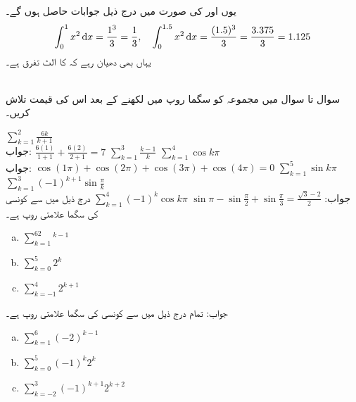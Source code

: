 یوں  اور  کی صورت میں درج ذیل جوابات حاصل ہوں گے۔
\begin{align*}
\int_0^1x^2\dif x=\frac{1^3}{3}=\frac{1}{3},\quad \int_0^{1.5}x^2\dif x=\frac{(1.5)^3}{3}=\frac{3.375}{3}=1.125
\end{align*}
یہاں بھی دھیان رہے کہ  کا الٹ تفرق  ہے۔

\\
سوال  تا سوال  میں مجموعہ کو سگما روپ میں لکھنے کے بعد اس کی قیمت تلاش کریں۔

$\sum\limits_{k=1}^2\tfrac{6k}{k+1}$\\
جواب:\quad
$\tfrac{6(1)}{1+1}+\tfrac{6(2)}{2+1}=7$
$\sum\limits_{k=1}^3\tfrac{k-1}{k}$
$\sum\limits_{k=1}^4\cos k\pi$\\
جواب:\quad
$\cos (1\pi)+\cos(2\pi)+\cos(3\pi)+\cos(4\pi)=0$
$\sum\limits_{k=1}^5\sin k\pi$
$\sum\limits_{k=1}^3(-1)^{k+1}\sin\tfrac{\pi}{k}$\\
جواب:\quad
$\sin\pi-\sin\tfrac{\pi}{2}+\sin\tfrac{\pi}{3}=\tfrac{\sqrt{3}-2}{2}$
$\sum\limits_{k=1}^4 (-1)^k\cos k\pi$
درج ذیل میں سے کونسی  کی سگما علامتی روپ ہے۔
\begin{multicols}{3}
\begin{enumerate}[a.]
\item
$\sum\limits_{k=1}^62^{k-1}$
\item
$\sum\limits_{k=0}^5 2^k$
\item
$\sum\limits_{k=-1}^4 2^{k+1}$
\end{enumerate}
\end{multicols}
جواب:\quad
تمام
درج ذیل میں سے کونسی  کی سگما علامتی روپ ہے۔
\begin{multicols}{3}
\begin{enumerate}[a.]
\item
$\sum\limits_{k=1}^6(-2)^{k-1}$\\
\item
$\sum\limits_{k=0}^5 (-1)^k2^k$
\item
$\sum\limits_{k=-2}^3 (-1)^{k+1}2^{k+2}$
\end{enumerate}
\end{multicols}
